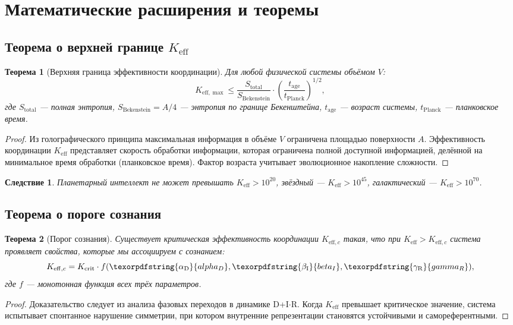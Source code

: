 \documentclass[12pt,a4paper]{article}
\newtheorem{theorem}{Теорема}
\newtheorem{corollary}{Следствие}
\DeclareRobustCommand{\alD}{\texorpdfstring{\ensuremath{\alpha_{\mathrm{D}}}}{alpha_D}}
\DeclareRobustCommand{\beI}{\texorpdfstring{\ensuremath{\beta_{\mathrm{I}}}}{beta_I}}
\DeclareRobustCommand{\gaR}{\texorpdfstring{\ensuremath{\gamma_{\mathrm{R}}}}{gamma_R}}
\newcommand{\eff}{\mathrm{eff}}
\newcommand{\Ke}{K_{\eff}}
\newcommand{\Kemax}{K_{\eff,\max}}
\newcommand{\Kec}{K_{\eff,c}}
\newcommand{\Kcrit}{K_{\mathrm{crit}}}
\begin{document}
	\section{Математические расширения и теоремы}
	
	\subsection{Теорема о верхней границе \(\Ke\)}
	
	\begin{theorem}[Верхняя граница эффективности координации]
		Для любой физической системы объёмом \(V\):
		\[
		\Kemax \leq \frac{S_{\mathrm{total}}}{S_{\mathrm{Bekenstein}}} \cdot \left(\frac{t_{\mathrm{age}}}{t_{\mathrm{Planck}}}\right)^{1/2},
		\]
		где \(S_{\mathrm{total}}\) — полная энтропия, \(S_{\mathrm{Bekenstein}} = A/4\) — энтропия по границе Бекенштейна, \(t_{\mathrm{age}}\) — возраст системы, \(t_{\mathrm{Planck}}\) — планковское время.
	\end{theorem}
	
	\begin{proof}
		Из голографического принципа максимальная информация в объёме \(V\) ограничена площадью поверхности \(A\). Эффективность координации \(\Ke\) представляет скорость обработки информации, которая ограничена полной доступной информацией, делённой на минимальное время обработки (планковское время). Фактор возраста учитывает эволюционное накопление сложности.
	\end{proof}
	
	\begin{corollary}
		Планетарный интеллект не может превышать \(\Ke > 10^{20}\), звёздный — \(\Ke > 10^{45}\), галактический — \(\Ke > 10^{70}\).
	\end{corollary}
	
	\subsection{Теорема о пороге сознания}
	
	\begin{theorem}[Порог сознания]
		Существует критическая эффективность координации \(K_{\eff,c}\) такая, что при \(\Ke > K_{\eff,c}\) система проявляет свойства, которые мы ассоциируем с сознанием:
		\[
		\Kec = \Kcrit \cdot f(\alD, \beI, \gaR),
		\]
		где \(f\) — монотонная функция всех трёх параметров.
	\end{theorem}
	
	\begin{proof}
		Доказательство следует из анализа фазовых переходов в динамике D+I\(\cdot\)R. Когда \(\Ke\) превышает критическое значение, система испытывает спонтанное нарушение симметрии, при котором внутренние репрезентации становятся устойчивыми и самореферентными.
	\end{proof}
	
\end{document}
